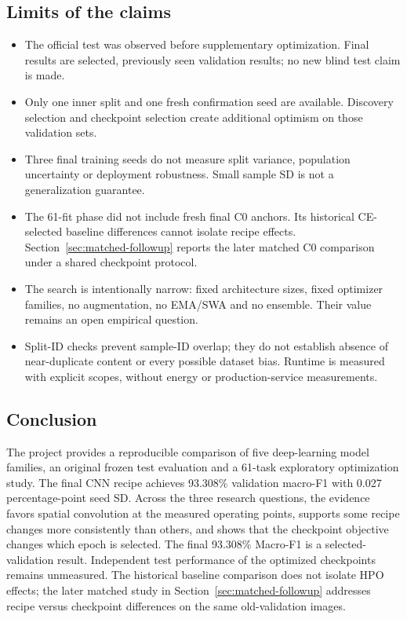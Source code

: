 \subsection{Limits of the claims}
\begin{itemize}
\item The official test was observed before supplementary optimization. Final results are selected, previously seen validation results; no new blind test claim is made.
\item Only one inner split and one fresh confirmation seed are available. Discovery selection and checkpoint selection create additional optimism on those validation sets.
\item Three final training seeds do not measure split variance, population uncertainty or deployment robustness. Small sample SD is not a generalization guarantee.
\item The 61-fit phase did not include fresh final C0 anchors. Its historical CE-selected baseline differences cannot isolate recipe effects. Section~\ref{sec:matched-followup} reports the later matched C0 comparison under a shared checkpoint protocol.
\item The search is intentionally narrow: fixed architecture sizes, fixed optimizer families, no augmentation, no EMA/SWA and no ensemble. Their value remains an open empirical question.
\item Split-ID checks prevent sample-ID overlap; they do not establish absence of near-duplicate content or every possible dataset bias. Runtime is measured with explicit scopes, without energy or production-service measurements.
\end{itemize}

\subsection{Conclusion}
The project provides a reproducible comparison of five deep-learning model families, an original frozen test evaluation and a 61-task exploratory optimization study. The final CNN recipe achieves 93.308\% validation macro-F1 with 0.027 percentage-point seed SD. Across the three research questions, the evidence favors spatial convolution at the measured operating points, supports some recipe changes more consistently than others, and shows that the checkpoint objective changes which epoch is selected. The final 93.308\% Macro-F1 is a selected-validation result. Independent test performance of the optimized checkpoints remains unmeasured. The historical baseline comparison does not isolate HPO effects; the later matched study in Section~\ref{sec:matched-followup} addresses recipe versus checkpoint differences on the same old-validation images.
